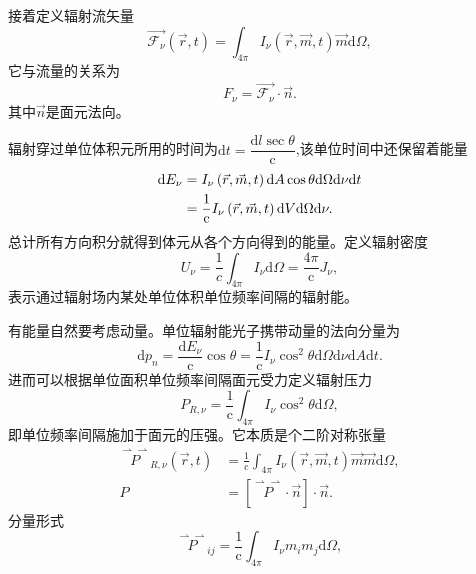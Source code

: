 \documentclass[../天体物理基础.tex]{subfiles}
\begin{document}
接着定义辐射流矢量
\begin{equation}
\vec{\mathcal{F}_{\nu}}(\vec{r},t)=\int_{4\pi}I_{\nu}\left(\vec{r},\vec{m},t\right)\vec{m}\mathrm{d}\Omega,
\end{equation}
它与流量的关系为
\begin{equation}
F_{\nu}=\vec{\mathcal{F}_{\nu}}\cdot\vec{n}.
\end{equation}
其中$\vec{n}$是面元法向。

辐射穿过单位体积元所用的时间为$\mathrm{d}t=\dfrac{\mathrm{d}l\sec\theta}{\mathrm{c}}$,该单位时间中还保留着能量
\begin{align}
\mathrm{d}E_{\nu}&=I_\nu\left(\vec{r},\vec{m},t\right)\mathrm{d}A\cos\theta\mathrm{d}\Omega\mathrm{d}\nu\mathrm{d}t\notag\\
&=\frac{1}{\mathrm{c}}I_\nu\left(\vec{r},\vec{m},t\right)\mathrm{d}V\mathrm{d}\Omega\mathrm{d}\nu.
\end{align}
总计所有方向积分就得到体元从各个方向得到的能量。定义辐射密度
\begin{equation}
U_{\nu}=\frac1c\int_{4\pi}I_{\nu}\mathrm{d}\Omega=\frac{4\pi}{\mathrm{c}}J_{\nu},
\end{equation}
表示通过辐射场内某处单位体积单位频率间隔的辐射能。

有能量自然要考虑动量。单位辐射能光子携带动量的法向分量为
\begin{equation}
\mathrm{d}p_{n}=\frac{\mathrm{d}E_{\nu}}{\mathrm{c}}\cos\theta=\frac{1}{\mathrm{c}}I_{\nu}\cos^{2}\theta\mathrm{d}\Omega\mathrm{d}\nu\mathrm{d}A\mathrm{d}t.
\end{equation}
进而可以根据单位面积单位频率间隔面元受力定义辐射压力
\begin{equation}
P_{R,\nu}=\frac{1}{\mathrm{c}}\int_{4\pi}I_{\nu}\cos^{2}\theta\mathrm{d}\Omega,
\end{equation}
即单位频率间隔施加于面元的压强。它本质是个二阶对称张量
\begin{align}
\overset{\rightharpoonup\!\!\!\rightharpoonup}{P}_{R,\nu}\left(\vec{r},t\right)&=\frac{1}{\mathrm{c}}\int_{4\pi}I_\nu\left(\vec{r},\vec{m},t\right)\vec{m}\vec{m}\mathrm{d}\Omega,\\
P&=\left[\overset{\rightharpoonup\!\!\!\rightharpoonup}P\cdot\vec n\right]\cdot\vec n.
\end{align}
分量形式
\begin{equation}
\overset{\rightharpoonup\!\!\!\rightharpoonup}P_{ij}=\frac{1}{\mathrm{c}}\int_{4\pi}I_{\nu}m_{i}m_{j}\mathrm{d}\Omega,
\end{equation}
\end{document}

